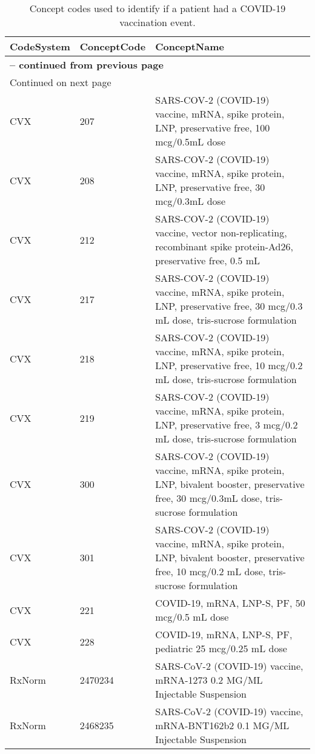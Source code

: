 \begin{longtable}{p{}p{}p{}}
\caption{Concept codes used to identify if a patient had a COVID-19 vaccination event.} \\ 
 CodeSystem & ConceptCode & ConceptName \\ 
  \hline 
\endfirsthead 
\multicolumn{3}{p{\textwidth}}{{ \bfseries \tablename \thetable{} -- continued from previous page}} \ 
\hline CodeSystem & ConceptCode & ConceptName \\ \hline 
\endhead 
\hline \multicolumn{3}{p{\textwidth}}{{Continued on next page}} \\ \hline 
\endfoot 
\hline 
\endlastfoot 
 \hline
CVX & 207 & SARS-COV-2 (COVID-19) vaccine, mRNA, spike protein, LNP, preservative free, 100 mcg/0.5mL dose \\ 
  CVX & 208 & SARS-COV-2 (COVID-19) vaccine, mRNA, spike protein, LNP, preservative free, 30 mcg/0.3mL dose \\ 
  CVX & 212 & SARS-COV-2 (COVID-19) vaccine, vector non-replicating, recombinant spike protein-Ad26, preservative free, 0.5 mL \\ 
  CVX & 217 & SARS-COV-2 (COVID-19) vaccine, mRNA, spike protein, LNP, preservative free, 30 mcg/0.3 mL dose, tris-sucrose formulation \\ 
  CVX & 218 & SARS-COV-2 (COVID-19) vaccine, mRNA, spike protein, LNP, preservative free, 10 mcg/0.2 mL dose, tris-sucrose formulation \\ 
  CVX & 219 & SARS-COV-2 (COVID-19) vaccine, mRNA, spike protein, LNP, preservative free, 3 mcg/0.2 mL dose, tris-sucrose formulation \\ 
  CVX & 300 & SARS-COV-2 (COVID-19) vaccine, mRNA, spike protein, LNP, bivalent booster, preservative free, 30 mcg/0.3mL dose, tris-sucrose formulation \\ 
  CVX & 301 & SARS-COV-2 (COVID-19) vaccine, mRNA, spike protein, LNP, bivalent booster, preservative free, 10 mcg/0.2 mL dose, tris-sucrose formulation \\ 
  CVX & 221 & COVID-19, mRNA, LNP-S, PF, 50 mcg/0.5 mL dose \\ 
  CVX & 228 & COVID-19, mRNA, LNP-S, PF, pediatric 25 mcg/0.25 mL dose \\ 
  RxNorm & 2470234 & SARS-CoV-2 (COVID-19) vaccine, mRNA-1273 0.2 MG/ML Injectable Suspension \\ 
  RxNorm & 2468235 & SARS-CoV-2 (COVID-19) vaccine, mRNA-BNT162b2 0.1 MG/ML Injectable Suspension \\ 

\end{longtable}
